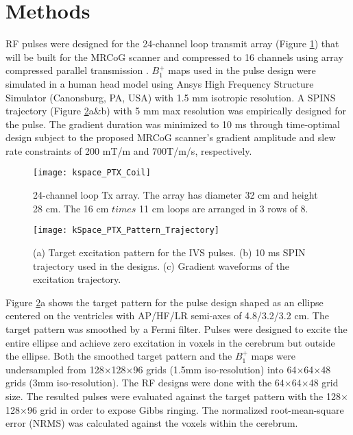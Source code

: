 \section*{Methods}
RF pulses were designed for the 24-channel loop transmit array (Figure \ref{fig:Coil}) that will be built for the MRCoG scanner  and compressed to 16 channels using array compressed parallel transmission \cite{cao2016array}. $B_1^+$ maps used in the pulse design were simulated in a human head model using Ansys High Frequency Structure Simulator (Canonsburg, PA, USA) with 1.5 mm isotropic resolution. A SPINS  trajectory \cite{malik2012tailored} (Figure \ref{fig:Target}a\&b) with 5 mm max resolution was empirically designed for the pulse. The gradient duration was minimized to 10 ms through time-optimal design \cite{lustig2008fast} subject to the proposed MRCoG scanner’s gradient amplitude and slew rate constraints of 200 mT/m and 700T/m/s, respectively. 

\begin{figure}
	\centering
	\texttt{[image: kspace\_PTX\_Coil]}
	\caption{24-channel loop Tx array. The array has diameter 32 cm and height 28 cm. The 16 cm $times$ 11 cm loops are arranged in 3 rows of 8.}
	\label{fig:Coil}
\end{figure}



\begin{figure}
	\centering
	\texttt{[image: kSpace\_PTX\_Pattern\_Trajectory]}
	\caption{(a) Target excitation pattern for the IVS pulses. (b) 10 ms SPIN trajectory used in the designs. (c) Gradient waveforms of the excitation trajectory.}
	\label{fig:Target}
\end{figure}
Figure \ref{fig:Target}a shows the target pattern for the pulse design shaped as an ellipse centered on the ventricles with AP/HF/LR semi-axes of 4.8/3.2/3.2 cm. The target pattern was smoothed by a Fermi filter. Pulses were designed to excite the entire ellipse and achieve zero excitation in voxels in the cerebrum but outside the ellipse. Both the smoothed target pattern and the $B_1^+$ maps were undersampled from 128$\times$128$\times$96 grids (1.5mm iso-resolution) into 64$\times$64$\times$48 grids (3mm iso-resolution). The RF designs were done with the 64$\times$64$\times$48 grid size. The resulted pulses were evaluated against the target pattern with the 128$\times$128$\times$96 grid in order to expose Gibbs ringing. The normalized root-mean-square error (NRMS) was calculated against the voxels within the cerebrum.

